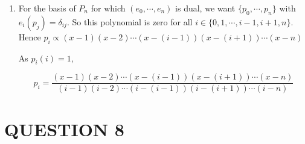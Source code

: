 \documentclass[a4paper]{article}
\begin{document}
\begin{enumerate}[label = (\alph*)]
\begin{proof}
		 
		 ie. 
		 
		 \[ \lambda_{0} \begin{pmatrix}
		 1 \\
		 0^{1} \\
		 \vdots \\
		 0^{n}
		 \end{pmatrix} + 
		  \cdots + 
		 \lambda_{n} \begin{pmatrix}
		 1\\
		 n^{1} \\
		 \vdots\\
		 n^{n}
		 \end{pmatrix} = 0 \]
		 
		 So by (a), $ \lambda_{1} = \lambda_{2} = \cdots = \lambda_{n} = 0 $.
		 
		 
	\end{proof}

	Now, $ \dim P_{n}^{*} = n+1 $, and $ \{ e_{0},\cdots,e_{n+1} \} $ is a linearly independent set. Hence it is a basis for $ P_{n}^{*} $
	
	\item For the basis of $ P_{n} $ for which $ (e_{0},\cdots,e_{n}) $ is dual, we want $ \{ p_{0},\cdots,p_{n} \} $ with $ e_{i}(p_{j}) = \delta_{ij} $.
	So this polynomial is zero for all $ i \in \{ 0,1,\cdots,i-1,i+1,n \} $. Hence $ p_{i} \propto (x-1)(x-2)\cdots(x-(i-1))(x-(i+1))\cdots(x-n) $
	
	As $ p_{i}(i) = 1 $,
	
	\[ p_{i} = \frac{(x-1)(x-2)\cdots(x-(i-1))(x-(i+1))\cdots(x-n)}{(i-1)(i-2)\cdots(i-(i-1))(i-(i+1))\cdots(i-n)  } \]
	
	
	
	
\end{enumerate}


\section{QUESTION 8}
\end{document}
